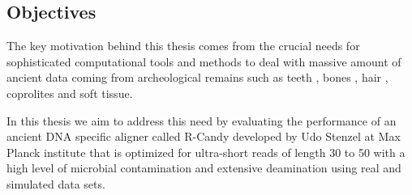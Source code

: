 \documentclass[11pt,a4paper]{report}
\begin{document}



\subsection{Objectives}

The key motivation behind this thesis comes from the crucial needs for 
sophisticated computational tools and methods to deal with massive amount of ancient data coming from archeological remains such as teeth \cite{teeth}, bones \cite{hagelberg1989ancient}, hair \cite{gilbert2004population}, coprolites \cite{coprolites} and soft tissue.

In this thesis we aim to address this need by evaluating the performance of an ancient DNA specific aligner called R-Candy developed by Udo Stenzel at Max Planck institute that is optimized for ultra-short reads of length 30 to 50 with a high level of microbial contamination and extensive deamination using real and simulated data sets. \\
\end{document}
